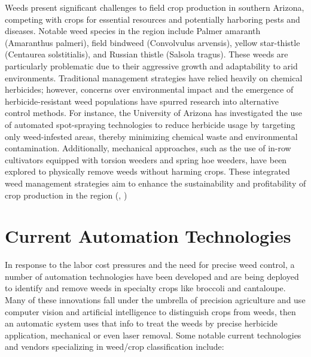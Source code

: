\documentclass[letterpaper, notitlepage]{report}
\begin{document}
Weeds present significant challenges to field crop production in southern Arizona, competing with crops for essential resources and potentially harboring pests and diseases. Notable weed species in the region include Palmer amaranth (Amaranthus palmeri), field bindweed (Convolvulus arvensis), yellow star-thistle (Centaurea solstitialis), and Russian thistle (Salsola tragus). These weeds are particularly problematic due to their aggressive growth and adaptability to arid environments. Traditional management strategies have relied heavily on chemical herbicides; however, concerns over environmental impact and the emergence of herbicide-resistant weed populations have spurred research into alternative control methods. For instance, the University of Arizona has investigated the use of automated spot-spraying technologies to reduce herbicide usage by targeting only weed-infested areas, thereby minimizing chemical waste and environmental contamination. Additionally, mechanical approaches, such as the use of in-row cultivators equipped with torsion weeders and spring hoe weeders, have been explored to physically remove weeds without harming crops. These integrated weed management strategies aim to enhance the sustainability and profitability of crop production in the region (\cite{Sturla2022-ug}, \cite{University-of-Arizona-CALESUnknown-er}) 

\section{Current Automation Technologies}

In response to the labor cost pressures and the need for precise weed control, a number of automation technologies have been developed and are being deployed to identify and remove weeds in specialty crops like broccoli and cantaloupe. Many of these innovations fall under the umbrella of precision agriculture and use computer vision and artificial intelligence to distinguish crops from weeds, then an automatic system uses that info to treat the weeds by precise herbicide application, mechanical or even laser removal. Some notable current technologies and vendors specializing in weed/crop classification include:
\end{document}
